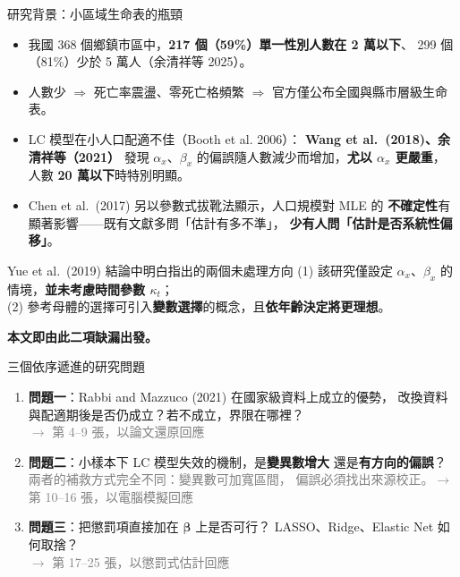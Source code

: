 \documentclass[aspectratio=169, UTF8, fontset=macnew, 11pt]{ctexbeamer}
\newcommand{\hi}[1]{\textcolor{red!70!black}{\textbf{#1}}}
\begin{document}
\begin{frame}{研究背景：小區域生命表的瓶頸}
\begin{itemize}\setlength{\itemsep}{7pt}
  \item 我國 368 個鄉鎮市區中，\hi{217 個（59\%）單一性別人數在 2 萬以下}、
        299 個（81\%）少於 5 萬人（余清祥等 2025）。
  \item 人數少 $\Rightarrow$ 死亡率震盪、零死亡格頻繁 $\Rightarrow$
        官方僅公布全國與縣市層級生命表。
  \item LC 模型在小人口配適不佳（Booth et al. 2006）：
        \textbf{Wang et al.\ (2018)、余清祥等（2021）} 發現 $\alpha_x$、$\beta_x$
        的偏誤隨人數減少而增加，\hi{尤以 $\alpha_x$ 更嚴重}，
        人數 \hi{20 萬以下}時特別明顯。
  \item Chen et al.\ (2017) 另以參數式拔靴法顯示，人口規模對 MLE 的
        \textbf{不確定性}有顯著影響——既有文獻多問「估計有多不準」，
        \hi{少有人問「估計是否系統性偏移」}。
\end{itemize}
\vspace{4pt}
\begin{block}{Yue et al.\ (2019) 結論中明白指出的兩個未處理方向}
\small
(1) 該研究僅設定 $\alpha_x$、$\beta_x$ 的情境，\hi{並未考慮時間參數 $\kappa_t$}；\\
(2) 參考母體的選擇可引入\textbf{變數選擇}的概念，且\hi{依年齡決定將更理想}。
\end{block}
\vspace{2pt}
\centerline{\small\textbf{本文即由此二項缺漏出發。}}
\end{frame}

\begin{frame}{三個依序遞進的研究問題}
\begin{enumerate}\setlength{\itemsep}{12pt}
  \item \textbf{問題一}：Rabbi and Mazzuco (2021) 在國家級資料上成立的優勢，
        改換資料與配適期後是否仍成立？若不成立，界限在哪裡？
        \\[2pt]\footnotesize\textcolor{gray}{$\rightarrow$ 第 4--9 張，以論文還原回應}
  \item \textbf{問題二}：小樣本下 LC 模型失效的機制，是\textbf{變異數增大}
        還是\textbf{有方向的偏誤}？\\[2pt]
        \footnotesize\textcolor{gray}{兩者的補救方式完全不同：變異數可加寬區間，
        偏誤必須找出來源校正。$\rightarrow$ 第 10--16 張，以電腦模擬回應}
  \item \textbf{問題三}：把懲罰項直接加在 $\boldsymbol{\beta}$ 上是否可行？
        LASSO、Ridge、Elastic Net 如何取捨？
        \\[2pt]\footnotesize\textcolor{gray}{$\rightarrow$ 第 17--25 張，以懲罰式估計回應}
\end{enumerate}
\end{frame}
\end{document}
